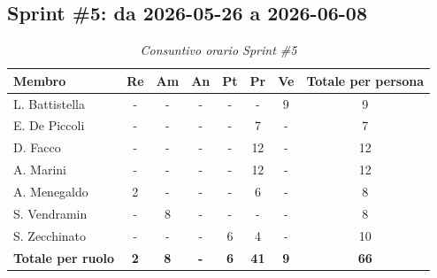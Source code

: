 ﻿\documentclass[a4paper, 10pt, colorlinks=true, linkcolor=black, urlcolor=blue, citecolor=blue, hidelinks]{article}
\renewcommand{\arraystretch}{1.2}
\begin{document}
\subsection{Sprint \#5: da 2026-05-26 a 2026-06-08}

\begin{table}[H]
    \centering
    \renewcommand{\arraystretch}{1.4}
    \begin{tabular}{|l|c|c|c|c|c|c|c|}
        \hline
        \rowcolor{bluBitless!15}
        \textbf{Membro} & \textbf{Re} & \textbf{Am} & \textbf{An} & \textbf{Pt} & \textbf{Pr} & \textbf{Ve} & \textbf{Totale per persona} \\
        \hline
        L. Battistella & - & - & - & - & - & 9 & 9 \\ \hline
        E. De Piccoli & - & - & - & - & 7 & - & 7 \\ \hline
        D. Facco & - & - & - & - & 12 & - & 12 \\ \hline
        A. Marini & - & - & - & - & 12 & - & 12 \\ \hline
        A. Menegaldo & 2 & - & - & - & 6 & - & 8 \\ \hline
        S. Vendramin & - & 8 & - & - & - & - & 8 \\ \hline
        S. Zecchinato & - & - & - & 6 & 4 & - & 10 \\ \hline
        \rowcolor{bluBitless!8}
        \textbf{Totale per ruolo} & \textbf{2} & \textbf{8} & \textbf{-} & \textbf{6} & \textbf{41} & \textbf{9} & \textbf{66} \\
        \hline
    \end{tabular}
    \caption{\textit{Consuntivo orario Sprint \#5}}
\end{table}
\end{document}
